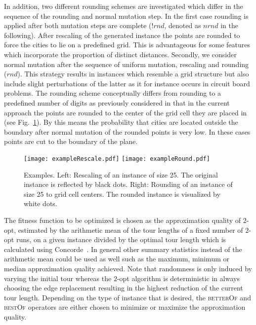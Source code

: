 \documentclass{article}
\begin{document}
In addition, two different rounding schemes are investigated which
differ in the sequence of the rounding and normal mutation step. In
the first case rounding is applied after both mutation steps are
complete ($!rnd$, denoted as $nrnd$ in the following). After rescaling
of the generated instance the points are rounded to force the cities
to lie on a predefined grid. This is advantageous for some features
which incorporate the proportion of distinct distances. Secondly, we
consider normal mutation after the sequence of uniform mutation,
rescaling and rounding ($rnd$). This strategy results in instances
which resemble a grid structure but also include slight perturbations
of the latter as it for instance occurs in circuit board problems. The
rounding scheme conceptually differs from rounding to a predefined
number of digits as previously considered in that in the current
approach the points are rounded to the center of the grid cell they
are placed in (see Fig.~\ref{fig:exRescRound}). By this means the
probability that cities are located outside the boundary after normal
mutation of the rounded points is very low. In these cases points are cut to the boundary of the plane.

\begin{figure}
  \centering
  \texttt{[image: exampleRescale.pdf]}
  \texttt{[image: exampleRound.pdf]}
  \caption{Examples. Left: Rescaling of an instance of size 25. The
    original instance is reflected by black dots. Right: Rounding of
    an instance of size 25 to grid cell centers. The rounded instance
    is visualized by white dots.}
  \label{fig:exRescRound}
\end{figure}

The fitness function to be optimized is chosen as the approximation
quality of $2$-opt, estimated by the arithmetic mean of the tour
lengths of a fixed number of $2$-opt runs, on a given instance divided
by the optimal tour length which is calculated using
Concorde~\cite{journals/informs/ApplegateCDR02}. In general other
summary statistics instead of the arithmetic mean could be used as
well such as the maximum, minimum or median approximation quality
achieved. Note that randomness is only induced by varying the initial
tour whereas the $2$-opt algorithm is deterministic in always choosing
the edge replacement resulting in the highest reduction of the current
tour length.  Depending on the type of instance that is desired, the
\textsc{betterOf} and \textsc{bestOf} operators are either chosen to
minimize or maximize the approximation quality.
\end{document}
